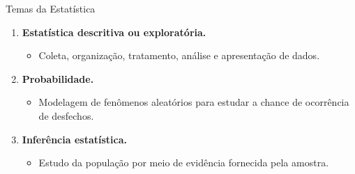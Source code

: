\documentclass[
  ignorenonframetext,
  serif,
  professionalfont,
  usenames,
  dvipsnames,
  aspectratio = 169]{beamer}
\providecommand{\tightlist}{%
  \setlength{\itemsep}{0pt}\setlength{\parskip}{0pt}}
\renewcommand{\tightlist}{%
  \setlength{\itemsep}{0\baselineskip}
  \setlength{\parskip}{0.25\baselineskip}
}
\begin{document}
\begin{frame}{Temas da Estatística}
\protect\hypertarget{temas-da-estatuxedstica}{}
\begin{enumerate}
\tightlist
\item
  \textbf{Estatística descritiva ou exploratória.}

  \begin{itemize}
  \tightlist
  \item
    Coleta, organização, tratamento, análise e apresentação de dados.
  \end{itemize}
\item
  \textbf{Probabilidade.}

  \begin{itemize}
  \tightlist
  \item
    Modelagem de fenômenos aleatórios para estudar a chance de
    ocorrência de desfechos.
  \end{itemize}
\item
  \textbf{Inferência estatística.}

  \begin{itemize}
  \tightlist
  \item
    Estudo da população por meio de evidência fornecida pela amostra.
  \end{itemize}
\end{enumerate}
\end{frame}
\end{document}
